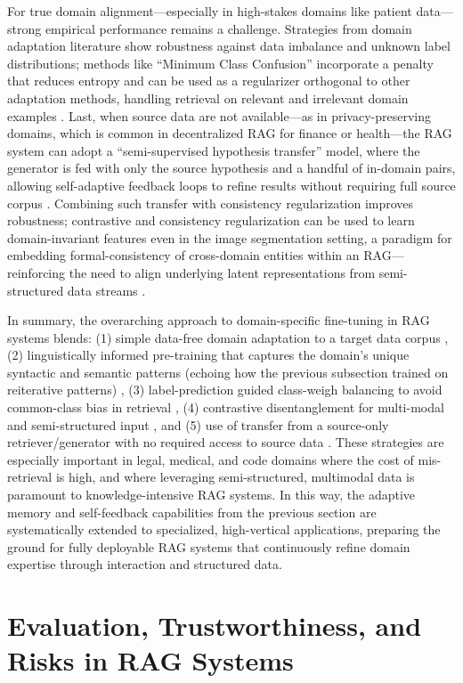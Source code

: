 \documentclass[11pt]{article}
\begin{document}
For true domain alignment---especially in high-stakes domains like patient data---strong empirical performance remains a challenge. Strategies from domain adaptation literature show robustness against data imbalance and unknown label distributions; methods like ``Minimum Class Confusion'' incorporate a penalty that reduces entropy and can be used as a regularizer orthogonal to other adaptation methods, handling retrieval on relevant and irrelevant domain examples \cite{ref118}. Last, when source data are not available---as in privacy-preserving domains, which is common in decentralized RAG for finance or health---the RAG system can adopt a ``semi-supervised hypothesis transfer'' model, where the generator is fed with only the source hypothesis and a handful of in-domain pairs, allowing self-adaptive feedback loops to refine results without requiring full source corpus \cite{ref119}. Combining such transfer with consistency regularization improves robustness; contrastive and consistency regularization can be used to learn domain-invariant features even in the image segmentation setting, a paradigm for embedding formal-consistency of cross-domain entities within an RAG---reinforcing the need to align underlying latent representations from semi-structured data streams \cite{ref120}.

In summary, the overarching approach to domain-specific fine-tuning in RAG systems blends: (1) simple data-free domain adaptation to a target data corpus \cite{ref110}, (2) linguistically informed pre-training that captures the domain's unique syntactic and semantic patterns (echoing how the previous subsection trained on reiterative patterns) \cite{ref111}, (3) label-prediction guided class-weigh balancing to avoid common-class bias in retrieval \cite{ref114,ref121}, (4) contrastive disentanglement for multi-modal and semi-structured input \cite{ref122,ref117}, and (5) use of transfer from a source-only retriever/generator with no required access to source data \cite{ref119}. These strategies are especially important in legal, medical, and code domains where the cost of mis-retrieval is high, and where leveraging semi-structured, multimodal data is paramount to knowledge-intensive RAG systems. In this way, the adaptive memory and self-feedback capabilities from the previous section are systematically extended to specialized, high-vertical applications, preparing the ground for fully deployable RAG systems that continuously refine domain expertise through interaction and structured data.

\section{Evaluation, Trustworthiness, and Risks in RAG Systems}
\end{document}
